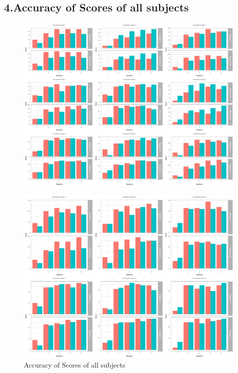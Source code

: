 \documentclass[12pt,epsf]{report}
\begin{document}
{\subsection*{4.Accuracy of Scores of all subjects}
\begin{figure}[!htb]
	\centering
	\includegraphics[width=1.0\textwidth]{Q5-2-1-labels.pdf}
	\centering
\end{figure}
\begin{figure}[!htb]
	\centering
	\includegraphics[width=1.0\textwidth]{Q5-2-2-labels.pdf}
	\caption{Accuracy of Scores of all subjects}
	\centering
\end{figure}
\FloatBarrier
}
\end{document}

